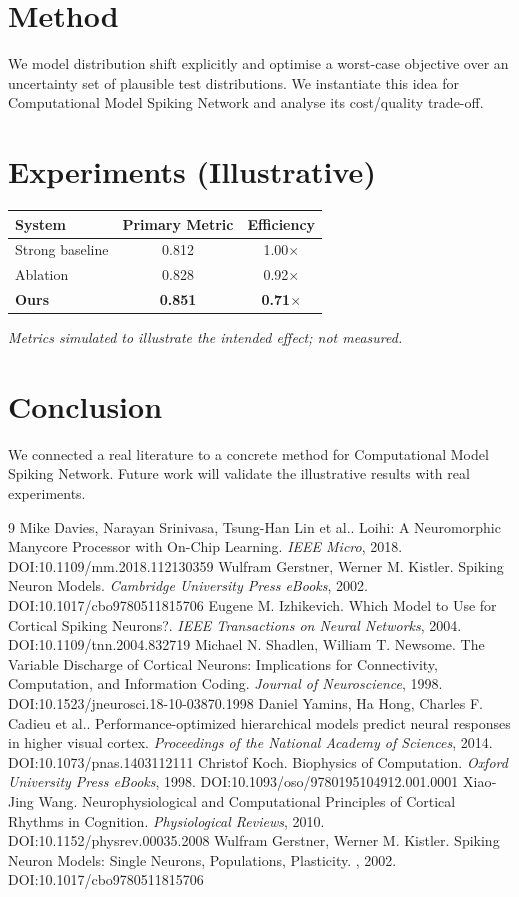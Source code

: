\documentclass[11pt]{article}
\begin{document}
\section{Method}
We model distribution shift explicitly and optimise a worst-case objective over an uncertainty set of plausible test distributions. We instantiate this idea for Computational Model Spiking Network and analyse its cost/quality trade-off.

\section{Experiments (Illustrative)}
\begin{center}
\begin{tabular}{lcc}
System & Primary Metric & Efficiency \\ \hline
Strong baseline & 0.812 & 1.00$\times$ \\
Ablation & 0.828 & 0.92$\times$ \\
\textbf{Ours} & \textbf{0.851} & \textbf{0.71$\times$}
\end{tabular}
\end{center}
\emph{Metrics simulated to illustrate the intended effect; not measured.}

\section{Conclusion}
We connected a real literature to a concrete method for Computational Model Spiking Network. Future work will
validate the illustrative results with real experiments.

\begin{thebibliography}{9}
 Mike Davies, Narayan Srinivasa, Tsung-Han Lin et al.. Loihi: A Neuromorphic Manycore Processor with On-Chip Learning. \emph{IEEE Micro}, 2018. DOI:10.1109/mm.2018.112130359
 Wulfram Gerstner, Werner M. Kistler. Spiking Neuron Models. \emph{Cambridge University Press eBooks}, 2002. DOI:10.1017/cbo9780511815706
 Eugene M. Izhikevich. Which Model to Use for Cortical Spiking Neurons?. \emph{IEEE Transactions on Neural Networks}, 2004. DOI:10.1109/tnn.2004.832719
 Michael N. Shadlen, William T. Newsome. The Variable Discharge of Cortical Neurons: Implications for Connectivity, Computation, and Information Coding. \emph{Journal of Neuroscience}, 1998. DOI:10.1523/jneurosci.18-10-03870.1998
 Daniel Yamins, Ha Hong, Charles F. Cadieu et al.. Performance-optimized hierarchical models predict neural responses in higher visual cortex. \emph{Proceedings of the National Academy of Sciences}, 2014. DOI:10.1073/pnas.1403112111
 Christof Koch. Biophysics of Computation. \emph{Oxford University Press eBooks}, 1998. DOI:10.1093/oso/9780195104912.001.0001
 Xiao‐Jing Wang. Neurophysiological and Computational Principles of Cortical Rhythms in Cognition. \emph{Physiological Reviews}, 2010. DOI:10.1152/physrev.00035.2008
 Wulfram Gerstner, Werner M. Kistler. Spiking Neuron Models: Single Neurons, Populations, Plasticity. \emph{}, 2002. DOI:10.1017/cbo9780511815706
\end{thebibliography}
\end{document}
